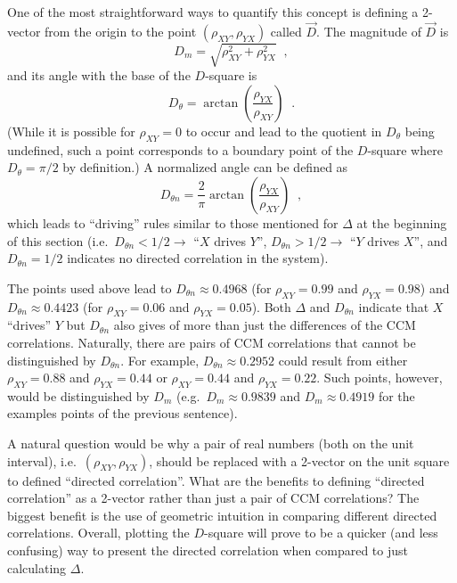 \documentclass[a4paper,11pt]{article}
\begin{document}
One of the most straightforward ways to quantify this concept is defining a 2-vector from the origin to the point $\left(\rho_{XY},\rho_{YX}\right)$ called $\vec{D}$.  The magnitude of $\vec{D}$ is 
$$
D_m = \sqrt{\rho_{XY}^2+\rho_{YX}^2}\;\;,
$$
and its angle with the base of the $D$-square is
$$
D_\theta = \arctan\left(\frac{\rho_{YX}}{\rho_{XY}}\right)\;\;.
$$
(While it is possible for $\rho_{XY}=0$ to occur and lead to the quotient in $D_\theta$ being undefined, such a point corresponds to a boundary point of the $D$-square where $D_\theta = \pi/2$ by definition.)  A normalized angle can be defined as
$$
D_{\theta n} = \frac{2}{\pi}\arctan\left(\frac{\rho_{YX}}{\rho_{XY}}\right)\;\;,
$$
which leads to ``driving'' rules similar to those mentioned for $\Delta$ at the beginning of this section (i.e.\ $D_{\theta n}<1/2\rightarrow$ ``$X$ drives $Y$'', $D_{\theta n}>1/2\rightarrow$ ``$Y$ drives $X$'', and $D_{\theta n}=1/2$ indicates no directed correlation in the system).  

The points used above lead to $D_{\theta n} \approx 0.4968$ (for $\rho_{XY} = 0.99$ and $\rho_{YX} = 0.98$) and $D_{\theta n} \approx 0.4423$ (for $\rho_{XY} = 0.06$ and $\rho_{YX} = 0.05$).  Both $\Delta$ and $D_{\theta n}$ indicate that $X$ ``drives'' $Y$ but $D_{\theta n}$ also gives of more than just the differences of the CCM correlations.  Naturally, there are pairs of CCM correlations that cannot be distinguished by $D_{\theta n}$.  For example, $D_{\theta n} \approx 0.2952$ could result from either $\rho_{XY} = 0.88$ and $\rho_{YX} = 0.44$ or $\rho_{XY} = 0.44$ and $\rho_{YX} = 0.22$.  Such points, however, would be distinguished by $D_m$ (e.g.\ $D_m \approx 0.9839$ and $D_m \approx 0.4919$ for the examples points of the previous sentence).

A natural question would be why a pair of real numbers (both on the unit interval), i.e.\ $\left(\rho_{XY},\rho_{YX}\right)$, should be replaced with a 2-vector on the unit square to defined ``directed correlation''.  What are the benefits to defining ``directed correlation'' as a 2-vector rather than just a pair of CCM correlations?  The biggest benefit is the use of geometric intuition in comparing different directed correlations.  Overall, plotting the $D$-square will prove to be a quicker (and less confusing) way to present the directed correlation when compared to just calculating $\Delta$.
\end{document}

